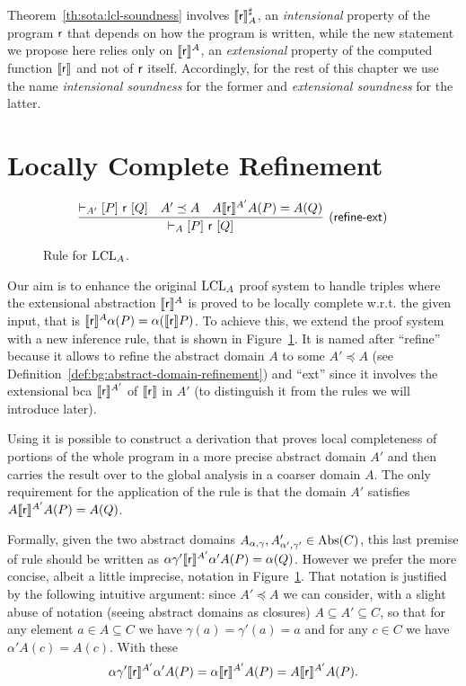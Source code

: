 Theorem~\ref{th:sota:lcl-soundness} involves $\llbracket\mathsf{r}\rrbracket^{\sharp}_A$, an \emph{intensional} property of the program $\mathsf{r}$ that depends on how the program is written, while the new statement we propose here relies only on $\llbracket\mathsf{r}\rrbracket^A$, an \emph{extensional} property of the computed function $\llbracket\mathsf{r}\rrbracket$ and not of $\mathsf{r}$ itself.
Accordingly, for the rest of this chapter we use the name \emph{intensional soundness} for the former and \emph{extensional soundness} for the latter.

\section{Locally Complete Refinement}
\begin{figure*}[t]
	\begin{framed}
		\[
		\infer[\lclrule{refine\mbox{-}ext}]
		{\lcl{A}{P}{\regr}{Q}}
		{\lcl{A'}{P}{\regr}{Q} & A' \preceq A & A \denot{\regr}^{A'} A(P) = A(Q)}
		\]
	\end{framed}
	\vspace{-1ex}
	\caption{Rule  for $\text{LCL}_A$.}\label{fig:lcla:rule-refine}
\end{figure*}

Our aim is to enhance the original $\text{LCL}_A$ proof system to handle triples where the extensional abstraction $\llbracket\mathsf{r}\rrbracket^{A}$ is proved to be locally complete w.r.t. the given input, that is $\llbracket\mathsf{r}\rrbracket^{A} \alpha(P) = \alpha(\llbracket\mathsf{r}\rrbracket P)$. To achieve this, we extend the proof system with a new inference rule, that is shown in Figure~\ref{fig:lcla:rule-refine}. It is named after ``refine'' because it allows to refine the abstract domain $A$ to some $A' \preceq A$ (see Definition~\ref{def:bg:abstract-domain-refinement}) and ``ext'' since it involves the extensional bca $\llbracket\mathsf{r}\rrbracket^{A'}$ of $\llbracket\mathsf{r}\rrbracket$ in $A'$ (to distinguish it from the rules we will introduce later).

Using  it is possible to construct a derivation that proves local completeness of portions of the whole program in a more precise abstract domain $A'$ and then carries the result over to the global analysis in a coarser domain $A$. The only requirement for the application of the rule is that the domain $A'$ satisfies $A \llbracket\mathsf{r}\rrbracket^{A'} A(P) = A(Q)$.

Formally, given the two abstract domains $A_{\alpha, \gamma}, A'_{\alpha', \gamma'} \in \text{\normalfont Abs}(C)$, this last premise of rule  should be written as $\alpha \gamma' \llbracket\mathsf{r}\rrbracket^{A'} \alpha' A(P) = \alpha(Q)$. However we prefer the more concise, albeit a little imprecise, notation in Figure~\ref{fig:lcla:rule-refine}. That notation is justified by the following intuitive argument: since $A' \preceq A$ we can consider, with a slight abuse of notation (seeing abstract domains as closures) $A \subseteq A' \subseteq C$, so that for any element $a \in A \subseteq C$ we have $\gamma(a) = \gamma'(a) = a$ and for any $c \in C$ we have $\alpha' A(c) = A(c)$. With these
\[
\alpha \gamma' \llbracket\mathsf{r}\rrbracket^{A'} \alpha' A(P) = \alpha \llbracket\mathsf{r}\rrbracket^{A'} A(P) = A \llbracket\mathsf{r}\rrbracket^{A'} A(P) .
\]

